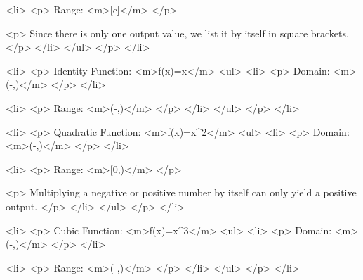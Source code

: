                         <li>
                            <p>
                                Range: <m>[c]</m>
                            </p>

                            <p>
                                Since there is only one output value, we list it by itself in square brackets.
                            </p>
                        </li>
                    </ul>
                </p>
            </li>

            <li>
                <p>
                    Identity Function: <m>f(x)=x</m>
                    <ul>
                        <li>
                            <p>
                                Domain: <m>(-\infty,\infty)</m>
                            </p>
                        </li>

                        <li>
                            <p>
                                Range: <m>(-\infty,\infty)</m>
                            </p>
                        </li>
                    </ul>
                </p>
            </li>

            <li>
                <p>
                    Quadratic Function: <m>f(x)=x^{2}</m>
                    <ul>
                        <li>
                            <p>
                                Domain: <m>(-\infty,\infty)</m>
                            </p>
                        </li>

                        <li>
                            <p>
                                Range: <m>[0,\infty)</m>
                            </p>

                            <p>
                                Multiplying a negative or positive number by itself can only yield a positive output.
                            </p>
                        </li>
                    </ul>
                </p>
            </li>

            <li>
                <p>
                    Cubic Function: <m>f(x)=x^{3}</m>
                    <ul>
                        <li>
                            <p>
                                Domain: <m>(-\infty,\infty)</m>
                            </p>
                        </li>

                        <li>
                            <p>
                                Range: <m>(-\infty,\infty)</m>
                            </p>
                        </li>
                    </ul>
                </p>
            </li>

